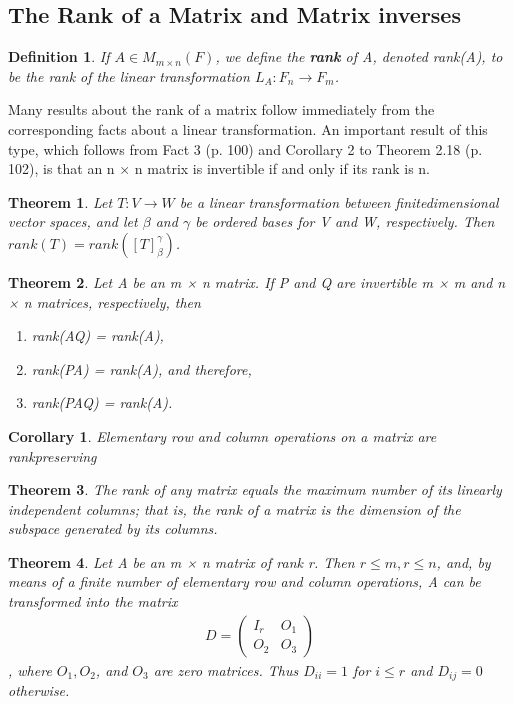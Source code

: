 \documentclass{article}
\newcommand{\bd}[1]{\textbf{#1}}
\newcommand*\bpmat[0]{\begin{pmatrix}}
\newcommand*\epmat[0]{\end{pmatrix}}
\theoremstyle{plain}
\newtheorem{theorem}{Theorem}[section]
\newtheorem*{corollary}{Corollary}
\newtheorem*{definition1}{Definition}
\theoremstyle{plain} %
\begin{document}
\subsection{The Rank of a Matrix and Matrix inverses}

\begin{definition1}
  If $A \in M_{m\times n}(F)$, we define the \bd{rank} of A, denoted rank(A), to be the rank of the linear transformation $L_A : F_n \to F_m$.
\end{definition1}

Many results about the rank of a matrix follow immediately from the corresponding facts about a linear transformation. An important result of this type, which follows from Fact 3 (p. 100) and Corollary 2 to Theorem 2.18 (p. 102), is that an n × n matrix is invertible if and only if its rank is n.

\begin{theorem}
  Let $T: V \to W$ be a linear transformation between finitedimensional vector spaces, and let $\beta$ and $\gamma$ be ordered bases for V and W, respectively. Then $rank(T) = rank([T]_{\beta}^\gamma)$.
\end{theorem}

\begin{theorem}
  Let A be an m × n matrix. If P and Q are invertible
m × m and n × n matrices, respectively, then
\begin{enumerate}[label=(\alph*)]
  \item rank(AQ) = rank(A),
  \item rank(PA) = rank(A),
and therefore,
  \item rank(PAQ) = rank(A).
\end{enumerate}
\end{theorem}

\begin{corollary}
  Elementary row and column operations on a matrix are rankpreserving
\end{corollary}

\begin{theorem}
  The rank of any matrix equals the maximum number of its linearly independent columns; that is, the rank of a matrix is the dimension of the subspace generated by its columns.
\end{theorem}

\begin{theorem}
  Let A be an m × n matrix of rank r. Then $r \leq m, r \leq n$, and, by means of a finite number of elementary row and column operations, A can be transformed into the matrix
  \begin{align*}
    D=\bpmat I_r&O_1\\O_2&O_3\epmat
  \end{align*}
, where $O_1, O_2$, and $O_3$ are zero matrices. Thus $D_{ii} = 1$ for $i \leq r$ and $D_{ij} = 0$ otherwise.
\end{theorem}
\end{document}
